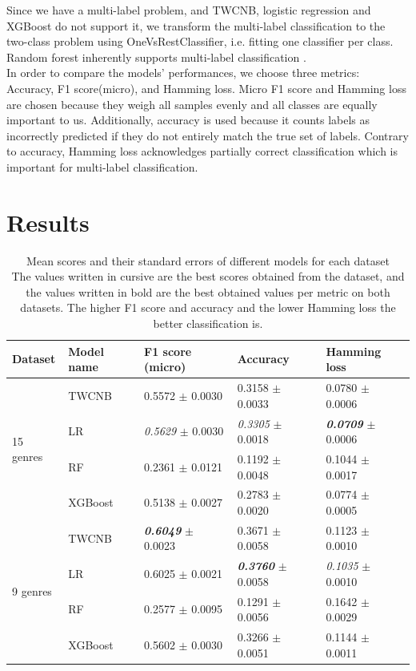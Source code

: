 \documentclass{article}
\begin{document}
Since we have a multi-label problem, and TWCNB, logistic regression and XGBoost do not support it, we transform the multi-label classification to the two-class problem using OneVsRestClassifier, i.e. fitting one classifier per class. Random forest inherently supports multi-label classification \cite{breiman2001random}. \\
In order to compare the models’ performances, we choose three metrics: Accuracy, F1 score(micro), and Hamming loss. Micro F1 score and Hamming loss are chosen because they weigh all samples evenly and all classes are equally important to us. Additionally, accuracy is used because it counts labels as incorrectly predicted if they do not entirely match the true set of labels. Contrary to accuracy, Hamming loss acknowledges partially correct classification which is important for multi-label classification. \\

\section{Results}

\begin{table}[ht]
\centering
\begin{tabular}{ |p{2cm}|p{2cm}||p{2cm}|p{2cm}|p{2cm}|  }
 \hline
 Dataset & Model name & F1 score (micro) & Accuracy & Hamming loss\\
 \hline \hline \hline
\multirow{4}{*}{15 genres} & TWCNB & 0.5572 $\pm$ 0.0030 & 0.3158 $\pm$ 0.0033 & 0.0780 $\pm$ 0.0006\\ \cline{2-5}
 & LR & \textit{0.5629} $\pm$ 0.0030 & \textit{0.3305} $\pm$ 0.0018 & \textbf{\textit{0.0709}} $\pm$ 0.0006 \\ \cline{2-5}
 & RF & 0.2361 $\pm$ 0.0121 & 0.1192 $\pm$ 0.0048 & 0.1044 $\pm$ 0.0017 \\ \cline{2-5}
 & XGBoost & 0.5138 $\pm$ 0.0027 & 0.2783 $\pm$ 0.0020 & 0.0774 $\pm$ 0.0005 \\ \hline \hline
\multirow{4}{*}{9 genres} & TWCNB & \textbf{\textit{0.6049}} $\pm$ 0.0023 & 0.3671 $\pm$ 0.0058 & 0.1123 $\pm$ 0.0010 \\ \cline{2-5}
 & LR & 0.6025 $\pm$ 0.0021 & \textbf{\textit{0.3760}} $\pm$ 0.0058 & \textit{0.1035} $\pm$ 0.0010 \\ \cline{2-5}
 & RF & 0.2577 $\pm$ 0.0095 & 0.1291 $\pm$ 0.0056 & 0.1642 $\pm$ 0.0029 \\ \cline{2-5}
 & XGBoost & 0.5602 $\pm$ 0.0030 & 0.3266 $\pm$ 0.0051 & 0.1144 $\pm$ 0.0011 \\ \hline
\end{tabular} \\
\caption{ \small{Mean scores and their standard errors of different models for each dataset \\ The values written in cursive are the best scores obtained from the dataset, and the values written in bold are the best obtained values per metric on both datasets. The higher F1 score and accuracy and the lower Hamming loss the better classification is.}}
\label{tab:table1}
\end{table}
\end{document}
